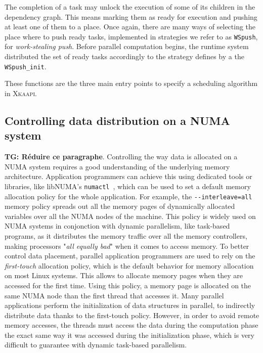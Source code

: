 \documentclass{Styles/llncs}
\newcommand{\kaapi}{\textsc{\mbox{Xkaapi}}\xspace}
\newcommand{\TG}[1]{{\color{red}\bfseries TG: #1}}
\begin{document}
The completion of a task may unlock the execution of some of its children in the dependency graph.
This means marking them as ready for execution and pushing at least one of them to a place.
Once again, there are many ways of selecting the place where to push ready tasks, implemented in strategies we refer to as \verb/WSpush/, for \emph{work-stealing push}.
Before parallel computation begins, the runtime system distributed the set of ready tasks accordingly  to the strategy defines by a the \verb/WSpush_init/.

These functions are the three main entry points to specify a scheduling algorithm in \kaapi. 

\subsection{Controlling data distribution on a NUMA system}
\TG{R\'eduire ce paragraphe}.
Controlling the way data is allocated on a NUMA system requires a good understanding of the underlying memory architecture.
Application programmers can achieve this using dedicated tools or libraries, like libNUMA's \verb!numactl!~\cite{DBLP:journals/corr/abs-1101-0093}, which can be used to set a default memory allocation policy for the whole application.
For example, the \verb!--interleave=all! memory policy spreads out all the memory pages of dynamically allocated variables over all the NUMA nodes of the machine.
This policy is widely used on NUMA systems in conjonction with dynamic parallelism, like task-based programs, as it distributes the memory traffic over all the memory controllers, making processors "\emph{all equally bad}" when it comes to access memory.
To better control data placement, parallel application programmers are used to rely on the \emph{first-touch} allocation policy, which is the default behavior for memory allocation on most Linux systems.
This allows to allocate memory pages when they are accessed for the first time.
Using this policy, a memory page is allocated on the same NUMA node than the first thread that accesses it.
Many parallel applications perform the initialization of data structures in parallel, to indirectly distribute data thanks to the first-touch policy.
However, in order to avoid remote memory accesses, the threads must access the data during the computation phase the exact same way it was accessed during the initialization phase, which is very difficult to guarantee with dynamic task-based parallelism.
\end{document}
